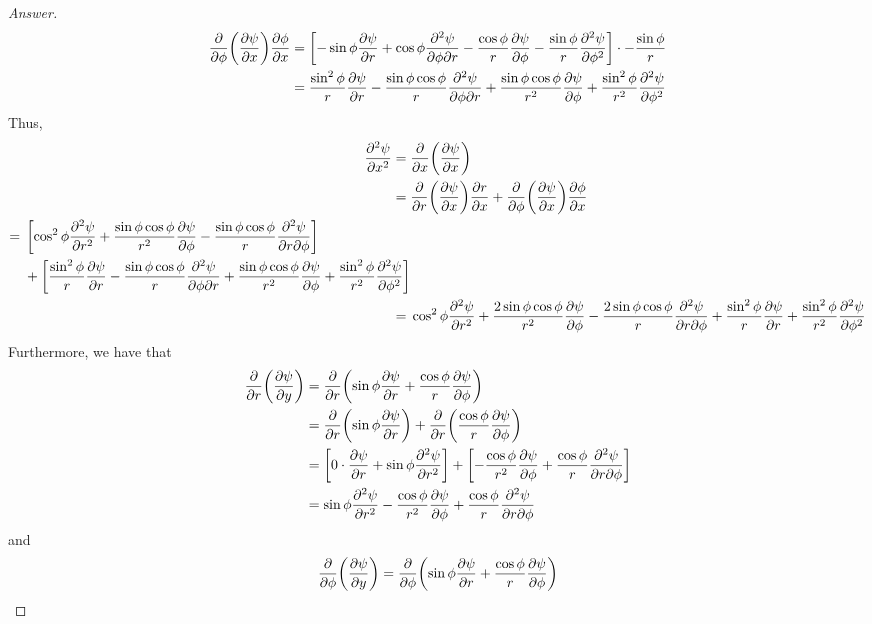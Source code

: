 \documentclass[../psets.tex]{subfiles}
\begin{document}
\begin{enumerate}
\begin{enumerate}
\begin{proof}[Answer]
\begin{align*}
                \pdv{\phi}(\pdv{\psi}{x})\pdv{\phi}{x} &= \left[ -\sin\phi\pdv{\psi}{r}+\cos\phi\pdv{\psi}{\phi}{r}-\frac{\cos\phi}{r}\pdv{\psi}{\phi}-\frac{\sin\phi}{r}\pdv[2]{\psi}{\phi} \right]\cdot-\frac{\sin\phi}{r}\\
                &= \frac{\sin^2\phi}{r}\pdv{\psi}{r}-\frac{\sin\phi\cos\phi}{r}\pdv{\psi}{\phi}{r}+\frac{\sin\phi\cos\phi}{r^2}\pdv{\psi}{\phi}+\frac{\sin^2\phi}{r^2}\pdv[2]{\psi}{\phi}
            \end{align*}
            Thus,
            \begin{align*}
                \pdv[2]{\psi}{x} ={}& \pdv{x}(\pdv{\psi}{x})\\
                ={}& \pdv{r}(\pdv{\psi}{x})\pdv{r}{x}+\pdv{\phi}(\pdv{\psi}{x})\pdv{\phi}{x}\\
                \begin{split}
                    ={}& \left[ \cos^2\phi\pdv[2]{\psi}{r}+\frac{\sin\phi\cos\phi}{r^2}\pdv{\psi}{\phi}-\frac{\sin\phi\cos\phi}{r}\pdv{\psi}{r}{\phi} \right]\\
                    & +\left[ \frac{\sin^2\phi}{r}\pdv{\psi}{r}-\frac{\sin\phi\cos\phi}{r}\pdv{\psi}{\phi}{r}+\frac{\sin\phi\cos\phi}{r^2}\pdv{\psi}{\phi}+\frac{\sin^2\phi}{r^2}\pdv[2]{\psi}{\phi} \right]
                \end{split}\\
                ={}& \cos^2\phi\pdv[2]{\psi}{r}+\frac{2\sin\phi\cos\phi}{r^2}\pdv{\psi}{\phi}-\frac{2\sin\phi\cos\phi}{r}\pdv{\psi}{r}{\phi}+\frac{\sin^2\phi}{r}\pdv{\psi}{r}+\frac{\sin^2\phi}{r^2}\pdv[2]{\psi}{\phi}
            \end{align*}
            Furthermore, we have that
            \begin{align*}
                \pdv{r}(\pdv{\psi}{y}) &= \pdv{r}(\sin\phi\pdv{\psi}{r}+\frac{\cos\phi}{r}\pdv{\psi}{\phi})\\
                &= \pdv{r}(\sin\phi\pdv{\psi}{r})+\pdv{r}(\frac{\cos\phi}{r}\pdv{\psi}{\phi})\\
                &= \left[ 0\cdot\pdv{\psi}{r}+\sin\phi\pdv[2]{\psi}{r} \right]+\left[ -\frac{\cos\phi}{r^2}\pdv{\psi}{\phi}+\frac{\cos\phi}{r}\pdv{\psi}{r}{\phi} \right]\\
                &= \sin\phi\pdv[2]{\psi}{r}-\frac{\cos\phi}{r^2}\pdv{\psi}{\phi}+\frac{\cos\phi}{r}\pdv{\psi}{r}{\phi}
            \end{align*}
            and
            \begin{align*}
                \pdv{\phi}(\pdv{\psi}{y}) &= \pdv{\phi}(\sin\phi\pdv{\psi}{r}+\frac{\cos\phi}{r}\pdv{\psi}{\phi})\\

\end{align*}
\end{proof}
\end{enumerate}
\end{enumerate}
\end{document}

